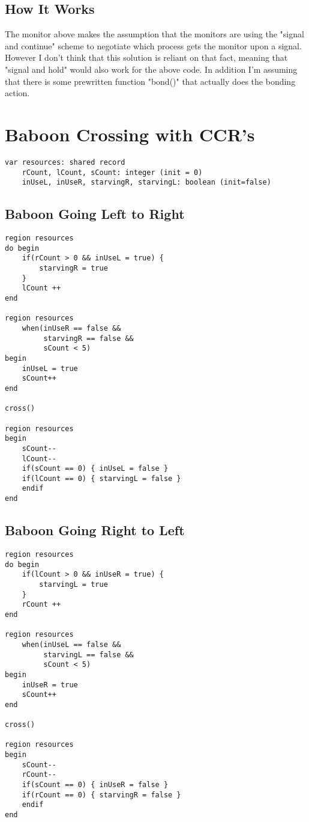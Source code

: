 \documentclass[]{article}
\begin{document}
\subsection{How It Works}
The monitor above makes the assumption that the monitors are
using the "signal and continue" scheme to negotiate which
process gets the monitor upon a signal. However I don't think
that this solution is reliant on that fact, meaning that "signal
and hold" would also work for the above code. In addition I'm
assuming that there is some prewritten function "bond()" that
actually does the bonding action. 

\newpage

\section{Baboon Crossing with CCR's}
\begin{verbatim}
var resources: shared record 
    rCount, lCount, sCount: integer (init = 0)
    inUseL, inUseR, starvingR, starvingL: boolean (init=false)
\end{verbatim}
    
\begin{multicols}{2}
\subsection{Baboon Going Left to Right}
\begin{verbatim}
region resources
do begin
    if(rCount > 0 && inUseL = true) {
        starvingR = true
    }
    lCount ++
end

region resources 
    when(inUseR == false &&
         starvingR == false && 
         sCount < 5) 
begin
    inUseL = true
    sCount++
end

cross()

region resources
begin
    sCount--
    lCount--
    if(sCount == 0) { inUseL = false }
    if(lCount == 0) { starvingL = false }
    endif
end
\end{verbatim}

\subsection{Baboon Going Right to Left}
\begin{verbatim}
region resources
do begin
    if(lCount > 0 && inUseR = true) {
        starvingL = true
    }
    rCount ++
end

region resources 
    when(inUseL == false &&
         starvingL == false && 
         sCount < 5) 
begin
    inUseR = true
    sCount++
end

cross()

region resources
begin
    sCount--
    rCount--
    if(sCount == 0) { inUseR = false }
    if(rCount == 0) { starvingR = false }
    endif
end
\end{verbatim}
\end{multicols}
\end{document}
